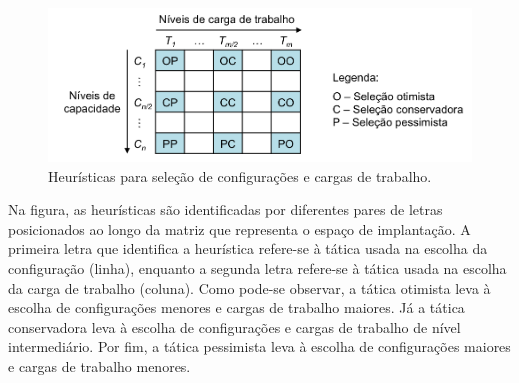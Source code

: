 \documentclass[12pt]{article}
\begin{document}


\begin{figure}[t]
  \begin{center}
    \includegraphics[trim = 20mm 5mm 20mm 10mm, scale=.6]{img/heuristicas2}
  \end{center}
  \caption{\label{fig:heuristicas}Heurísticas para seleção de configurações e cargas de trabalho.}
\end{figure}

Na figura, as heurísticas são identificadas por diferentes pares de letras posicionados ao longo da matriz que representa o espaço de implantação. A primeira letra que identifica a heurística refere-se à tática usada na escolha da configuração (linha), enquanto a segunda letra refere-se à tática usada na escolha da carga de trabalho (coluna). Como pode-se observar, a tática otimista leva à escolha de configurações menores e cargas de trabalho maiores. Já a tática conservadora leva à escolha de configurações e cargas de trabalho de nível intermediário. Por fim, a tática pessimista leva à escolha de configurações maiores e cargas de trabalho menores.
 
\end{document}
